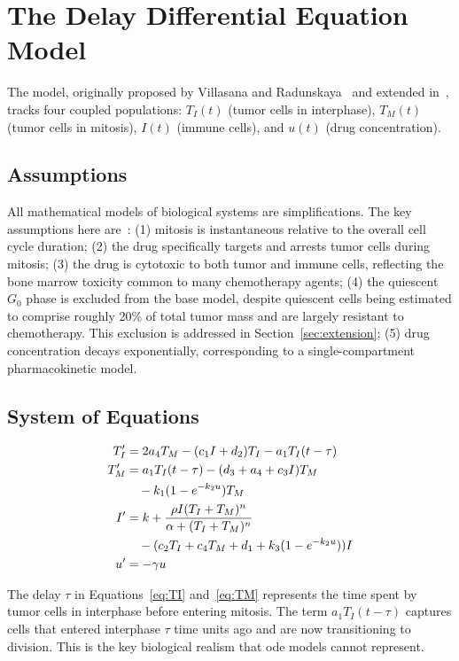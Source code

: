 \section{The Delay Differential Equation Model}
\label{sec:model}

The model, originally proposed by Villasana and Radunskaya~\cite{villasana_delay_2003} and extended in~\cite{villasana_heuristic_2004}, tracks four coupled populations: $T_I(t)$ (tumor cells in interphase), $T_M(t)$ (tumor cells in mitosis), $I(t)$ (immune cells), and $u(t)$ (drug concentration).

\subsection{Assumptions}

All mathematical models of biological systems are simplifications. The key assumptions here are~\cite{villasana_delay_2003}: (1) mitosis is instantaneous relative to the overall cell cycle duration; (2) the drug specifically targets and arrests tumor cells during mitosis; (3) the drug is cytotoxic to both tumor and immune cells, reflecting the bone marrow toxicity common to many chemotherapy agents; (4) the quiescent $G_0$ phase is excluded from the base model, despite quiescent cells being estimated to comprise roughly 20\% of total tumor mass and are largely resistant to chemotherapy. This exclusion is addressed in Section~\ref{sec:extension}; (5) drug concentration decays exponentially, corresponding to a single-compartment pharmacokinetic model.

\subsection{System of Equations}

\begin{align}
  T_I' &= 2a_4T_M - (c_1I + d_2)T_I - a_1T_I(t-\tau) \label{eq:TI} \\
  T_M' &= a_1T_I(t-\tau) - (d_3 + a_4 + c_3I)T_M \notag \\
       &\quad - k_1(1-e^{-k_2u})T_M \label{eq:TM} \\
  I'   &= k + \frac{\rho I(T_I+T_M)^n}{\alpha+(T_I+T_M)^n} \notag \\
       &\quad - (c_2T_I + c_4T_M + d_1 + k_3(1-e^{-k_2u}))I \label{eq:I} \\
  u'   &= -\gamma u \label{eq:u}
\end{align}

The delay $\tau$ in Equations~\ref{eq:TI} and~\ref{eq:TM} represents the time spent by tumor cells in interphase before entering mitosis. The term $a_1T_I(t-\tau)$ captures cells that entered interphase $\tau$ time units ago and are now transitioning to division. This is the key biological realism that \gls{ode} models cannot represent.

